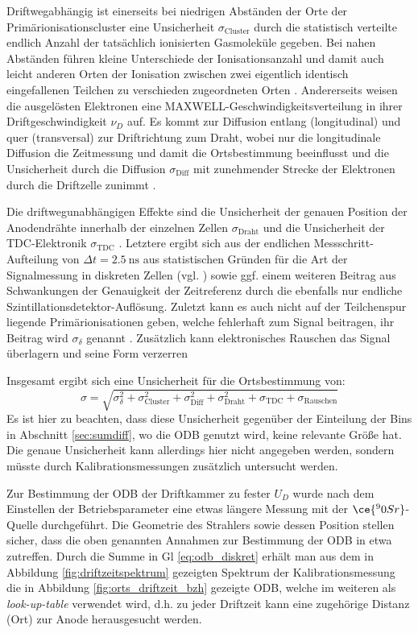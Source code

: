Driftwegabhängig ist einerseits bei niedrigen Abständen der Orte der Primärionisationscluster eine Unsicherheit $\sigma_\text{Cluster}$ durch die statistisch verteilte endlich Anzahl der tatsächlich ionisierten Gasmoleküle gegeben. Bei nahen Abständen führen kleine Unterschiede der Ionisationsanzahl und damit auch leicht anderen Orten der Ionisation zwischen zwei eigentlich identisch eingefallenen Teilchen zu verschieden zugeordneten Orten \cite[250-252]{kolanoskiwermerdetektoren}. Andererseits weisen die ausgelösten Elektronen eine \uppercase{Maxwell}-Geschwindigkeitsverteilung in ihrer Driftgeschwindigkeit $\nu_D$ auf. Es kommt zur Diffusion entlang (longitudinal) und quer (transversal) zur Driftrichtung zum Draht, wobei nur die longitudinale Diffusion die Zeitmessung und damit die Ortsbestimmung beeinflusst und die Unsicherheit durch die Diffusion $\sigma_\text{Diff}$ mit zunehmender Strecke der Elektronen durch die Driftzelle zunimmt \cite[16-18]{hammanndiplom}.

Die driftwegunabhängigen Effekte sind die Unsicherheit der genauen Position der Anodendrähte innerhalb der einzelnen Zellen $\sigma_\text{Draht}$ und die Unsicherheit der TDC-Elektronik $\sigma_\text{TDC}$ \cite[16-18]{hammanndiplom}. Letztere ergibt sich aus der endlichen Messschritt-Aufteilung von $\Delta t=\SI{2.5}{\nano\s}$ aus statistischen Gründen für die Art der Signalmessung in diskreten Zellen (vgl. \cite[253,843]{kolanoskiwermerdetektoren}) sowie ggf. einem weiteren Beitrag aus Schwankungen der Genauigkeit der Zeitreferenz durch die ebenfalls nur endliche Szintillationsdetektor-Auflösung. Zuletzt kann es auch nicht auf der Teilchenspur liegende Primärionisationen geben, welche fehlerhaft zum Signal beitragen, ihr Beitrag wird $\sigma_\delta$ genannt \cite[18]{hammanndiplom}. Zusätzlich kann elektronisches Rauschen das Signal überlagern und seine Form verzerren \cite[253]{kolanoskiwermerdetektoren}

Insgesamt ergibt sich eine Unsicherheit für die Ortsbestimmung von: \cite[18]{hammanndiplom} \[
\sigma = \sqrt{\sigma^2_\delta + \sigma^2_\text{Cluster} + \sigma^2_\text{Diff} + \sigma^2_\text{Draht} + \sigma_\text{TDC} + \sigma_\text{Rauschen}}
\]
Es ist hier zu beachten, dass diese Unsicherheit gegenüber der Einteilung der Bins in Abschnitt \ref{sec:sumdiff}, wo die ODB genutzt wird, keine relevante Größe hat. Die genaue Unsicherheit kann allerdings hier nicht angegeben werden, sondern müsste durch Kalibrationsmessungen zusätzlich untersucht werden.

Zur Bestimmung der ODB der Driftkammer zu fester $U_D$ wurde nach dem Einstellen der Betriebsparameter eine etwas längere Messung mit der $\ce{^90Sr}$-Quelle durchgeführt. Die Geometrie des Strahlers sowie dessen Position stellen sicher, dass die oben genannten Annahmen zur Bestimmung der ODB in etwa zutreffen.
Durch die Summe in Gl \eqref{eq:odb_diskret} erhält man aus dem in Abbildung \ref{fig:driftzeitspektrum} gezeigten Spektrum der Kalibrationsmessung die in Abbildung \ref{fig:orts_driftzeit_bzh} gezeigte ODB, welche im weiteren als \textit{look-up-table} verwendet wird, d.h. zu jeder Driftzeit kann eine zugehörige Distanz (Ort) zur Anode herausgesucht werden.

